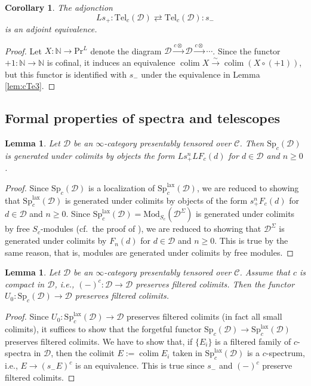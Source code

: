 \documentclass{amsart}
\theoremstyle{plain}
\newtheorem{lemma}[theorem]{Lemma}
\newtheorem{corollary}[theorem]{Corollary}
\theoremstyle{definition}
\theoremstyle{remark}
\numberwithin{equation}{theorem}
\newcommand{\mcal}[1]{\mathcal{#1}}
\newcommand{\mbb}[1]{\mathbb{#1}}
\newcommand{\Mod}{\mathrm{Mod}}
\renewcommand{\Pr}{\mathrm{Pr}}
\newcommand{\Sp}{\mathrm{Sp}}
\newcommand{\Tel}{\mathrm{Tel}}
\newcommand{\lax}{\mathrm{lax}}
\newcommand{\colim}{\operatorname*{colim}}
\begin{document}
\begin{corollary}\label{cor:cTe}
The adjonction
\[
	Ls_+ \colon \Tel_c(\mcal{D}) \rightleftarrows \Tel_c(\mcal{D}) \colon s_-
\]
is an adjoint equivalence.
\end{corollary}
\begin{proof}
Let $X\colon\mbb{N}\to\Pr^L$ denote the diagram $\mcal{D}\xrightarrow{c\otimes}\mcal{D}\xrightarrow{c\otimes}\cdots$.
Since the functor $+1\colon\mbb{N}\to\mbb{N}$ is cofinal, it induces an equivalence $\colim X\xrightarrow{\sim}\colim(X\circ (+1))$, but this functor is identified with $s_-$ under the equivalence in Lemma \ref{lem:cTe3}.
\end{proof}


\subsection{Formal properties of spectra and telescopes}\label{FPr}

\begin{lemma}\label{lem:FPr2}
Let $\mcal{D}$ be an $\infty$-category presentably tensored over $\mcal{C}$.
Then $\Sp_c(\mcal{D})$ is generated under colimits by objects the form $Ls_+^nLF_c(d)$ for $d\in\mcal{D}$ and $n\ge 0$.
\end{lemma}
\begin{proof}
Since $\Sp_c(\mcal{D})$ is a localization of $\Sp_c^\lax(\mcal{D})$, we are reduced to showing that $\Sp^\lax_c(\mcal{D})$ is generated under colimits by objects of the form $s_+^nF_c(d)$ for $d\in\mcal{D}$ and $n\ge 0$.
Since $\Sp^\lax_c(\mcal{D})=\Mod_{S_c}(\mcal{D}^\Sigma)$ is generated under colimits by free $S_c$-modules (cf.\ the proof of \cite[5.3.2.12]{HA}), we are reduced to showing that $\mcal{D}^\Sigma$ is generated under colimits by $F_n(d)$ for $d\in\mcal{D}$ and $n\ge 0$.
This is true by the same reason, that is, modules are generated under colimits by free modules.
\end{proof}

\begin{lemma}\label{lem:FPr3}
Let $\mcal{D}$ be an $\infty$-category presentably tensored over $\mcal{C}$.
Assume that $c$ is compact in $\mcal{D}$, i.e., $(-)^c\colon\mcal{D}\to\mcal{D}$ preserves filtered colimits.
Then the functor $U_0\colon\Sp_c(\mcal{D})\to\mcal{D}$ preserves filtered colimits.
\end{lemma}
\begin{proof}
Since $U_0\colon\Sp^\lax_c(\mcal{D})\to\mcal{D}$ preserves filtered colimits (in fact all small colimits), it suffices to show that the forgetful functor $\Sp_c(\mcal{D})\to\Sp^\lax_c(\mcal{D})$ preserves filtered colimits.
We have to show that, if $\{E_i\}$ is a filtered family of $c$-spectra in $\mcal{D}$, then the colimit $E:=\colim E_i$ taken in $\Sp^\lax_c(\mcal{D})$ is a $c$-spectrum, i.e., $E\to(s_-E)^c$ is an equivalence.
This is true since $s_-$ and $(-)^c$ preserve filtered colimits.
\end{proof}
\end{document}
